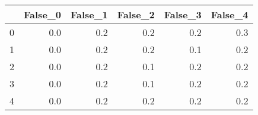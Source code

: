 \begin{tabular}{lrrrrr}
\toprule
{} &  False\_0 &  False\_1 &  False\_2 &  False\_3 &  False\_4 \\ \hline
\midrule
0 &      0.0 &      0.2 &      0.2 &      0.2 &      0.3 \\ \hline
1 &      0.0 &      0.2 &      0.2 &      0.1 &      0.2 \\ \hline
2 &      0.0 &      0.2 &      0.1 &      0.2 &      0.2 \\ \hline
3 &      0.0 &      0.2 &      0.1 &      0.2 &      0.2 \\ \hline
4 &      0.0 &      0.2 &      0.2 &      0.2 &      0.2 \\ \hline
\bottomrule
\end{tabular}
